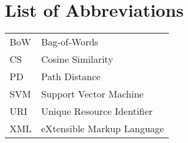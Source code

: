 \chapter*{List of Abbreviations}

\begin{table}[htbp]
    \begin{center}
        \begin{tabularx}{\textwidth}{lX}
            BoW & Bag-of-Words \\
            CS & Cosine Similarity \\
            PD & Path Distance \\
            SVM & Support Vector Machine \\
            URI & Unique Resource Identifier \\
            XML & eXtensible Markup Language \\
        \end{tabularx}
    \end{center}
    \label{tab:glossary}
\end{table}